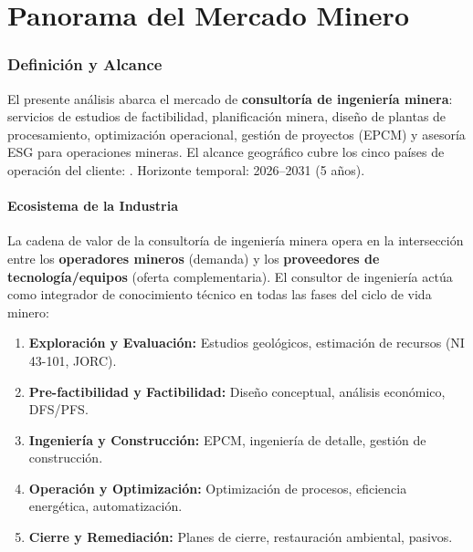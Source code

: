 \chapter{Panorama del Mercado Minero}

\subsection{Definición y Alcance}

\begin{calloutbox}
El presente análisis abarca el mercado de \textbf{consultoría de ingeniería minera}: servicios de estudios de factibilidad, planificación minera, diseño de plantas de procesamiento, optimización operacional, gestión de proyectos (EPCM) y asesoría ESG para operaciones mineras. El alcance geográfico cubre los cinco países de operación del cliente: . Horizonte temporal: 2026--2031 (5 años).
\end{calloutbox}

\subsubsection{Ecosistema de la Industria}

La cadena de valor de la consultoría de ingeniería minera opera en la intersección entre los \textbf{operadores mineros} (demanda) y los \textbf{proveedores de tecnología/equipos} (oferta complementaria). El consultor de ingeniería actúa como integrador de conocimiento técnico en todas las fases del ciclo de vida minero:

\begin{enumerate}
    \item \textbf{Exploración y Evaluación:} Estudios geológicos, estimación de recursos (NI 43-101, JORC).
    \item \textbf{Pre-factibilidad y Factibilidad:} Diseño conceptual, análisis económico, DFS/PFS.
    \item \textbf{Ingeniería y Construcción:} EPCM, ingeniería de detalle, gestión de construcción.
    \item \textbf{Operación y Optimización:} Optimización de procesos, eficiencia energética, automatización.
    \item \textbf{Cierre y Remediación:} Planes de cierre, restauración ambiental, pasivos.
\end{enumerate}

